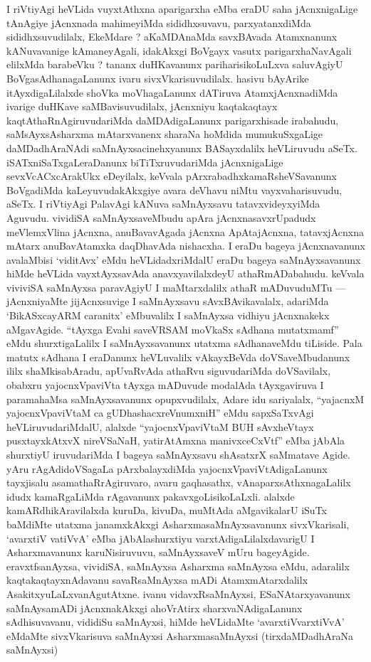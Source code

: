 \begin{artha}
I riVtiyAgi heVLida vuyxtAthxna aparigarxha eMba eraDU saha jAcnxnigaLige tAnAgiye jAcnxnada mahimeyiMda sididhxsuvavu, parxyatanxdiMda sididhxsuvudilalx, \-EkeMdare ? aKaMDAnaMda savxBAvada Atamxnanunx kANuvavanige kAmaneyAgali, idakAkxgi BoVgayx vasutx parigarxhaNavAgali elilxMda barabeVku ? tananx duHKa\-vanunx pariharisikoLuLxva saluvAgiyU BoVgasAdhanagaLanunx ivaru sivxVkarisuvudilalx. \-hasivu bAyArike itAyxdigaLilalxde shoVka moVhagaLanunx dATiruva Atamx\break jAcnxnadiMda ivarige duHKave saMBavisuvudilalx, jAcnxniyu kaqtakaqtayx kaqtAthaRnAgi\-ruvudariMda daMDAdigaLanunx parigarxhisade irabahudu, saMsAyxsAsharxma \-mAtarxvanenx sharaNa hoMdida mumukuSxgaLige daMDadhAraNAdi saMnAyxsacinehxyanunx BASayxdalilx heVLiruvudu aSeTx. iSATxniSaTxgaLeraDanunx biTiTxruvudariMda jAcnxnigaLige sevxVcACxcArakUkx eDeyilalx, keVvala pArxrabadhxkamaRsheVSavanunx BoVgadiMda kaLeyuvudakAkxgiye avara deVhavu niMtu vayxvaharisuvudu, aSeTx. I riVtiyAgi PalavAgi kANuva \-saMnAyxsavu tatavxvideyxyiMda Aguvudu. vividiSA saMnAyxsaveMbudu apAra jAcnxnasavxrUpadudx meVlemxVlina jAcnxna, anuBavavAgada jAcnxna ApAtajAcnxna, tatavxjAcnxna mAtarx anu\-BavAtamxka daqDhavAda nishacxha. I eraDu bageya jAcnxnavanunx avalaMbisi `viditAvx' eMdu heVLidadxriMdalU eraDu bageya saMnAyxsavanunx hiMde heVLida vayxtAyxsavAda anavxya\-vilalxdeyU athaRmADabahudu. keVvala viviviSA saMnAyxsa paravAgiyU I maMtarxdalilx athaR mADuvuduMTu --- jAcnxniyaMte jijAcnxsuvige I saMnAyxsavu sAvxBAvikavalalx, adariMda `BikASxcayARM caranitx' eMbuvalilx I saMnAyxsa \-vidhiyu jAcnxnakekx aMgavAgide. ``tAyxga Evahi saveVRSAM moVkaSx sAdhana mutatxmamf'' eMdu shurxtigaLalilx I saMnAyxsavanunx utatxma sAdhanaveMdu tiLiside. Pala matutx sAdhana I eraDanunx heVLuvalilx vAkayxBeVda doVSaveMbudanunx ililx shaMkisabAradu, apUvaRvAda athaRvu siguvudariMda doVSavilalx, obabxru yajocnxVpaviVta tAyxga mADuvude modalAda tAyxgaviruva I paramahaMsa saMnAyxsavanunx opupxvu\-dilalx, Adare idu sariyalalx, ``yajacnxM yajocnxVpaviVtaM ca gUDhashacxreVnumxniH'' eMdu sapxSaTxvAgi heVLiruvudariMdalU, alalxde ``yajocnxVpaviVtaM BUH sAvxheVtayx \-pusxtayxkAtxvX nireVSaNaH, yatirAtAmxna manivxceCxVtf'' eMba jAbAla shurxtiyU iruvudariMda I bageya saMnAyxsavu shAsatxrX saMmatave Agide. yAru rAgAdidoVSagaLa pArxbalayx\-diMda yajocnxVpaviVtAdigaLanunx tayxjisalu asamathaRrAgiruvaro, avaru gaqhasathx, vAnaparxsAthxnagaLalilx idudx kamaRgaLiMda rAgavanunx pakavxgoLisikoLaLxli. alalxde kamAR\-dhikAravilalxda kuruDa, kivuDa, muMtAda aMgavikalarU iSuTx baMdiMte utatxma janamxkAkxgi AsharxmasaMnAyxsavanunx sivxVkarisali, `avarxtiV vatiVvA' eMba jAbAla\-shurxtiyu varxtAdigaLilalxdavarigU I Asharxmavanunx karuNisiruvuvu, saMnAyxsaveV mUru bage\-yAgide. eravxtfsanAyxsa, vividiSA, saMnAyxsa Asharxma saMnAyxsa eMdu, adaralilx kaqtakaqtayxnAdavanu savaRsaMnAyxsa mADi AtamxmAtarxdalilx AsakitxyuLaLxvanAgutAtxne. ivanu vidavxRsaMnAyxsi, ESaNAtarxyavanunx saMnAysamADi jAcnxnakAkxgi ahoVrAtirx sharxvaNAdigaLanunx sAdhisuvavanu, vididiSu saMnAyxsi, hiMde heVLidaMte `avarxtiVvarxtiVvA' eMdaMte sivxVkarisuva saMnAyxsi AsharxmasaMnAyxsi (tirxdaMDadhAraNa saMnAyxsi)
\end{artha}


